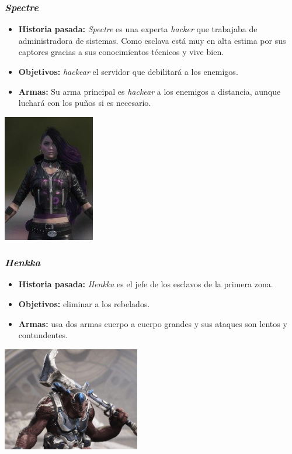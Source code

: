 \documentclass[11pt, twoside]{article}
\begin{document}
\subsubsection{\textit{Spectre}}
\begin{itemize}
\item \textbf{Historia pasada:} \textit{Spectre} es una experta \textit{hacker} que trabajaba de administradora de sistemas. Como esclava está muy en alta estima por sus captores gracias a sus conocimientos técnicos y vive bien. 
\item \textbf{Objetivos:} \textit{hackear} el servidor que debilitará a los enemigos.
\item \textbf{Armas:} Su arma principal es \textit{hackear} a los enemigos a distancia, aunque luchará con los puños si es necesario.
\end{itemize}

\begin{center}
\includegraphics[width=4cm]{./images/spectre.jpg}
\end{center}

\subsubsection{\textit{Henkka}}
\begin{itemize}
\item \textbf{Historia pasada:} \textit{Henkka} es el jefe de los esclavos de la primera zona.
\item \textbf{Objetivos:} eliminar a los rebelados.
\item \textbf{Armas:} usa dos armas cuerpo a cuerpo grandes y sus ataques son lentos y contundentes. 
\end{itemize}

\begin{center}
\includegraphics[width=6cm]{./images/henkka.jpg}
\end{center}
\end{document}
